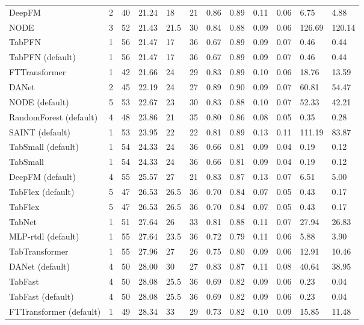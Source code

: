\begin{tabular}{lllllrllllll}
DeepFM & 2 & 40 & 21.24 & 18 & 21 & 0.86 & 0.89 & 0.11 & 0.06 & 6.75 & 4.88 \\
NODE & 3 & 52 & 21.43 & 21.5 & 30 & 0.84 & 0.88 & 0.09 & 0.06 & 126.69 & 120.14 \\
TabPFN & 1 & 56 & 21.47 & 17 & 36 & 0.67 & 0.89 & 0.09 & 0.07 & 0.46 & 0.44 \\
TabPFN (default) & 1 & 56 & 21.47 & 17 & 36 & 0.67 & 0.89 & 0.09 & 0.07 & 0.46 & 0.44 \\
FTTransformer & 1 & 42 & 21.66 & 24 & 29 & 0.83 & 0.89 & 0.10 & 0.06 & 18.76 & 13.59 \\
DANet & 2 & 45 & 22.19 & 24 & 27 & 0.89 & 0.90 & 0.09 & 0.07 & 60.81 & 54.47 \\
NODE (default) & 5 & 53 & 22.67 & 23 & 30 & 0.83 & 0.88 & 0.10 & 0.07 & 52.33 & 42.21 \\
RandomForest (default) & 4 & 48 & 23.86 & 21 & 35 & 0.80 & 0.86 & 0.08 & 0.05 & 0.35 & 0.28 \\
SAINT (default) & 1 & 53 & 23.95 & 22 & 22 & 0.81 & 0.89 & 0.13 & 0.11 & 111.19 & 83.87 \\
TabSmall (default) & 1 & 54 & 24.33 & 24 & 36 & 0.66 & 0.81 & 0.09 & 0.04 & 0.19 & 0.12 \\
TabSmall & 1 & 54 & 24.33 & 24 & 36 & 0.66 & 0.81 & 0.09 & 0.04 & 0.19 & 0.12 \\
DeepFM (default) & 4 & 55 & 25.57 & 27 & 21 & 0.83 & 0.87 & 0.13 & 0.07 & 6.51 & 5.00 \\
TabFlex (default) & 5 & 47 & 26.53 & 26.5 & 36 & 0.70 & 0.84 & 0.07 & 0.05 & 0.43 & 0.17 \\
TabFlex & 5 & 47 & 26.53 & 26.5 & 36 & 0.70 & 0.84 & 0.07 & 0.05 & 0.43 & 0.17 \\
TabNet & 1 & 51 & 27.64 & 26 & 33 & 0.81 & 0.88 & 0.11 & 0.07 & 27.94 & 26.83 \\
MLP-rtdl (default) & 1 & 55 & 27.64 & 23.5 & 36 & 0.72 & 0.79 & 0.11 & 0.06 & 5.88 & 3.90 \\
TabTransformer & 1 & 55 & 27.96 & 27 & 26 & 0.75 & 0.80 & 0.09 & 0.06 & 12.91 & 10.46 \\
DANet (default) & 4 & 50 & 28.00 & 30 & 27 & 0.83 & 0.87 & 0.11 & 0.08 & 40.64 & 38.95 \\
TabFast & 4 & 50 & 28.08 & 25.5 & 36 & 0.69 & 0.82 & 0.09 & 0.06 & 0.23 & 0.04 \\
TabFast (default) & 4 & 50 & 28.08 & 25.5 & 36 & 0.69 & 0.82 & 0.09 & 0.06 & 0.23 & 0.04 \\
FTTransformer (default) & 1 & 49 & 28.34 & 33 & 29 & 0.73 & 0.82 & 0.10 & 0.09 & 15.85 & 11.48 \\

\end{tabular}
